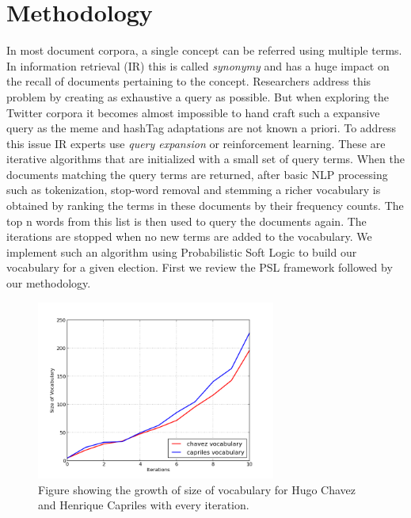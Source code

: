 \section{Methodology}
In most document corpora, a single concept can be referred using multiple terms.
In information retrieval (IR) this is called \emph{synonymy} and has a huge impact on the recall of documents pertaining to the concept.
Researchers address this problem by creating as exhaustive a query as possible. 
But when exploring the Twitter corpora it becomes almost impossible to hand craft such a expansive query as the meme and hashTag adaptations are not known a priori. 
\newline
To address this issue IR experts use \emph{query expansion} or reinforcement learning.
These are iterative algorithms that are initialized with a small set of query terms. 
When the documents matching the query terms are returned, after basic NLP processing such as tokenization, stop-word removal and stemming a richer vocabulary is obtained by ranking the terms in these documents by their frequency counts.
The top n words from this list is then used to query the documents again. 
The iterations are stopped when no new terms are added to the vocabulary. 
We implement such an algorithm using Probabilistic Soft Logic to build our vocabulary for a given election. 
First we review the PSL framework followed by our methodology.
\begin{figure}[Ht]
	\centering
	\includegraphics[width=0.7\textwidth, height=0.3\textheight]{support_files/WordGrowth.png}
	\vspace{-1em}
	\caption{Figure showing the growth of size of vocabulary for Hugo Chavez and Henrique Capriles with every iteration.}
	\label{fig:wordgrowth}
	\vspace{-1em}
\end{figure}

